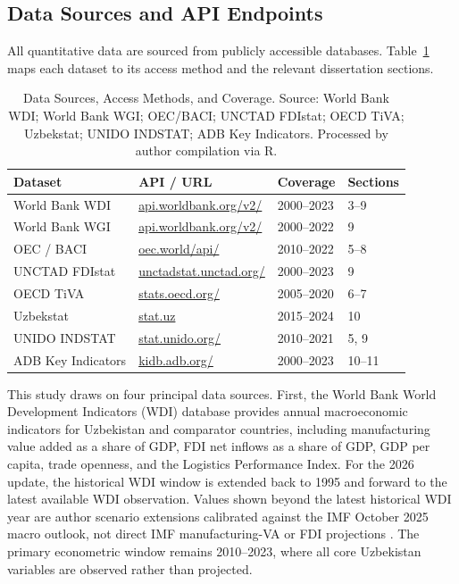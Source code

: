 \subsection{Data Sources and API Endpoints}

All quantitative data are sourced from publicly accessible databases. Table~\ref{tab:datasources} maps each dataset to its access method and the relevant dissertation sections.

\begin{table}[H]
 \centering
 \caption{Data Sources, Access Methods, and Coverage. Source: World Bank WDI; World Bank WGI; OEC/BACI; UNCTAD FDIstat; OECD TiVA; Uzbekstat; UNIDO INDSTAT; ADB Key Indicators. Processed by author compilation via R.}
 \label{tab:datasources}
 \small
 \begin{tabular}{@{}p{3.5cm}p{4.5cm}p{2.5cm}p{1.5cm}@{}}
 \toprule
 Dataset & API / URL & Coverage & Sections \\
 \midrule
 World Bank WDI & \url{api.worldbank.org/v2/} & 2000--2023 & 3--9 \\
 World Bank WGI & \url{api.worldbank.org/v2/} & 2000--2022 & 9 \\
 OEC / BACI & \url{oec.world/api/} & 2010--2022 & 5--8 \\
 UNCTAD FDIstat & \url{unctadstat.unctad.org/} & 2000--2023 & 9 \\
 OECD TiVA & \url{stats.oecd.org/} & 2005--2020 & 6--7 \\
 Uzbekstat & \url{stat.uz} & 2015--2024 & 10 \\
 UNIDO INDSTAT & \url{stat.unido.org/} & 2010--2021 & 5, 9 \\
 ADB Key Indicators & \url{kidb.adb.org/} & 2000--2023 & 10--11 \\
 \bottomrule
 \end{tabular}
\end{table}

This study draws on four principal data sources. First, the World Bank World Development Indicators (WDI) database \citep{world_bank_wdi} provides annual macroeconomic indicators for Uzbekistan and comparator countries, including manufacturing value added as a share of GDP, FDI net inflows as a share of GDP, GDP per capita, trade openness, and the Logistics Performance Index. For the 2026 update, the historical WDI window is extended back to 1995 and forward to the latest available WDI observation. Values shown beyond the latest historical WDI year are author scenario extensions calibrated against the IMF October 2025 macro outlook, not direct IMF manufacturing-VA or FDI projections \citep{imf2025uzbekistan}. The primary econometric window remains 2010--2023, where all core Uzbekistan variables are observed rather than projected.

